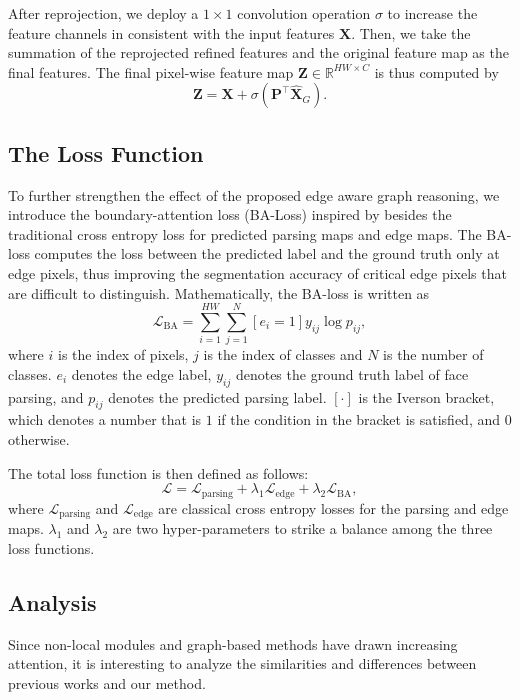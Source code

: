 \documentclass[runningheads]{llncs}
\def\P{{\mathbf P}}
\def\X{{\mathbf X}}
\def\Z{{\mathbf Z}}
\begin{document}
After reprojection, we deploy a $1 \times 1$ convolution operation $\sigma$ to increase the feature channels in consistent with the input features $\X$. 
Then, we take the summation of the reprojected refined features and the original feature map as the final features.
The final pixel-wise feature map $\Z \in \mathbb{R}^{HW \times C}$ is thus computed by 
\begin{equation}
    \Z = \X + \sigma(\P^{\top}\hat{\X}_G).
\end{equation}



\subsection{The Loss Function}
To further strengthen the effect of the proposed edge aware graph reasoning, we introduce the boundary-attention loss (BA-Loss) inspired by \cite{liu2020new} besides the traditional cross entropy loss for predicted parsing maps and edge maps.
The BA-loss computes the loss between the predicted label and the ground truth only at edge pixels, thus improving the segmentation accuracy of critical edge pixels that are difficult to distinguish.
Mathematically, the BA-loss is written as 
\begin{equation}
    \mathcal{L}_{\text{BA}} = \sum_{i=1}^{HW}\sum_{j=1}^{N}\left[ e_i = 1 \right] y_{ij}\log{p_{ij}},
\end{equation}
where $i$ is the index of pixels, $j$ is the index of classes and $N$ is the number of classes. $e_i$ denotes the edge label, $y_{ij}$ denotes the ground truth label of face parsing, and $p_{ij}$ denotes the predicted parsing label. 
$\left[ \cdot \right]$ is the Iverson bracket, which denotes a number that is $1$ if the condition in the bracket is satisfied, and $0$ otherwise. 

The total loss function is then defined as follows:
\begin{equation}
    \mathcal{L} = \mathcal{L}_{\text{parsing}} + \lambda_1\mathcal{L}_{\text{edge}} + \lambda_2\mathcal{L}_{\text{BA}},
\end{equation}
where $\mathcal{L}_{\text{parsing}}$ and $\mathcal{L}_{\text{edge}}$ are classical cross entropy losses for the parsing and edge maps.
$\lambda_1$ and $\lambda_2$ are two hyper-parameters to strike a balance among the three loss functions.  

\subsection{Analysis} \label{sec3.3}
Since non-local modules and graph-based methods have drawn increasing attention, it is interesting to analyze the similarities and differences between previous works and our method. 
\end{document}
